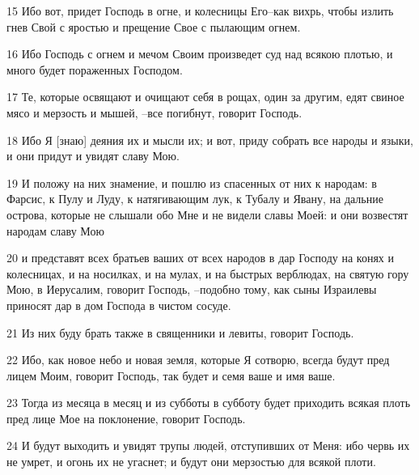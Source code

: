 \par 15 Ибо вот, придет Господь в огне, и колесницы Его--как вихрь, чтобы излить гнев Свой с яростью и прещение Свое с пылающим огнем.
\par 16 Ибо Господь с огнем и мечом Своим произведет суд над всякою плотью, и много будет пораженных Господом.
\par 17 Те, которые освящают и очищают себя в рощах, один за другим, едят свиное мясо и мерзость и мышей, --все погибнут, говорит Господь.
\par 18 Ибо Я [знаю] деяния их и мысли их; и вот, приду собрать все народы и языки, и они придут и увидят славу Мою.
\par 19 И положу на них знамение, и пошлю из спасенных от них к народам: в Фарсис, к Пулу и Луду, к натягивающим лук, к Тубалу и Явану, на дальние острова, которые не слышали обо Мне и не видели славы Моей: и они возвестят народам славу Мою
\par 20 и представят всех братьев ваших от всех народов в дар Господу на конях и колесницах, и на носилках, и на мулах, и на быстрых верблюдах, на святую гору Мою, в Иерусалим, говорит Господь, --подобно тому, как сыны Израилевы приносят дар в дом Господа в чистом сосуде.
\par 21 Из них буду брать также в священники и левиты, говорит Господь.
\par 22 Ибо, как новое небо и новая земля, которые Я сотворю, всегда будут пред лицем Моим, говорит Господь, так будет и семя ваше и имя ваше.
\par 23 Тогда из месяца в месяц и из субботы в субботу будет приходить всякая плоть пред лице Мое на поклонение, говорит Господь.
\par 24 И будут выходить и увидят трупы людей, отступивших от Меня: ибо червь их не умрет, и огонь их не угаснет; и будут они мерзостью для всякой плоти.


